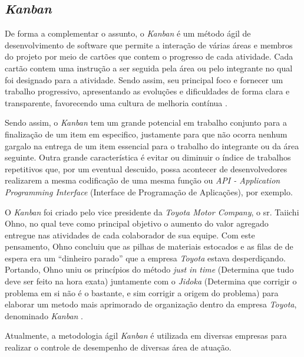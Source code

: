 \subsection{\textbf{\textit{Kanban}}}

De forma a complementar o assunto, o \textit{Kanban} é um método ágil de desenvolvimento de software que permite a interação de várias áreas e membros do projeto por meio de cartões que contem o progresso de cada atividade. Cada cartão contem uma instrução a ser seguida pela área ou pelo integrante no qual foi designado para a atividade. Sendo assim, seu principal foco e fornecer um trabalho progressivo, apresentando as evoluções e dificuldades de forma clara e transparente, favorecendo uma cultura de melhoria contínua \cite{KANBAN2014}.

Sendo assim, o \textit{Kanban} tem um grande potencial em trabalho conjunto para a finalização de um item em especifico, justamente para que não ocorra nenhum gargalo na entrega de um item essencial para o trabalho do integrante ou da área seguinte. Outra grande característica é evitar ou diminuir o índice de trabalhos repetitivos que, por um eventual descuido, possa acontecer de desenvolvedores realizarem a mesma codificação de uma mesma função ou \textit{API - Application Programming Interface} (Interface de Programação de Aplicações), por exemplo.

O \textit{Kanban} foi criado pelo vice presidente da \textit{Toyota Motor Company}, o sr. Taiichi Ohno, no qual teve como principal objetivo o aumento do valor agregado entregue nas atividades de cada colaborador de sua equipe. Com este pensamento,  Ohno concluiu que as pilhas de materiais estocados e as filas de de espera era um “dinheiro parado” que a empresa \textit{Toyota} estava desperdiçando. Portando,   Ohno uniu os princípios do método \textit{just in time} (Determina que tudo deve ser feito na hora exata)  juntamente com o \textit{Jidoka} (Determina que corrigir o problema em si não é o bastante, e sim corrigir a origem do problema) para elaborar um metodo mais aprimorado de organização dentro da empresa \textit{Toyota}, denominado \textit{Kanban} \cite{TOYOTA1977}.

Atualmente, a metodologia ágil \textit{Kanban} é utilizada em diversas empresas para realizar o controle de desempenho de diversas área de atuação.